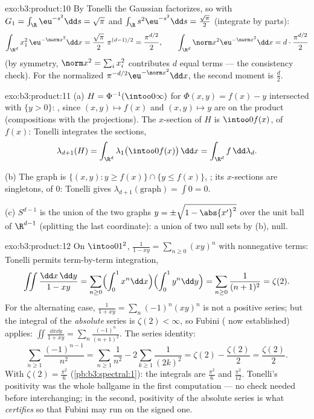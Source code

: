 \begin{solution}{exo:b3:product:10}
By Tonelli the Gaussian factorizes, so with $G_1 =
\int_\R\eu^{-s^2}\dd s = \sqrt\pi$ and $\int_\R
s^2\eu^{-s^2}\dd s = \frac{\sqrt\pi}2$ (integrate by parts):
\[
\int_{\R^d}x_1^2\,\eu^{-\norm x^2}\dd x =
\frac{\sqrt\pi}2\;\pi^{(d-1)/2} = \frac{\pi^{d/2}}2,
\qquad
\int_{\R^d}\norm x^2\eu^{-\norm x^2}\dd x =
d\cdot\frac{\pi^{d/2}}2
\]
(by symmetry, $\norm x^2 = \sum_ix_i^2$ contributes $d$ equal
terms --- the consistency check). For the normalized 
$\pi^{-d/2}\eu^{-\norm x^2}\dd x$, the second moment is
$\frac d2$.
\end{solution}

\begin{solution}{exo:b3:product:11}
(a) $H = \Phi^{-1}(\intoo0\infty)$ for $\Phi(x, y) = f(x) -
y$ intersected with $\{y > 0\}$: , since $(x, y)
\mapsto f(x)$ and $(x,y)\mapsto y$ are  on the
product (compositions with the projections). The
$x$-section of $H$ is $\intoo0{f(x)}$, of  $f(x)$:
Tonelli integrates the sections,
\[
\lambda_{d+1}(H) = \int_{\R^d}\lambda_1\bigl(\intoo0{f(x)}
\bigr)\,\dd x = \int_{\R^d}f\,\dd\lambda_d .
\]

(b) The graph is $\{(x,y) : y \geq f(x)\} \cap \{y \leq
f(x)\}$, ; its $x$-sections are singletons, of
 $0$: Tonelli gives $\lambda_{d+1}(\text{graph}) =
\int 0 = 0$.

(c) $S^{d-1}$ is the union of the two graphs $y =
\pm\sqrt{1 - \abs{x'}^2}$ over the unit ball of $\R^{d-1}$
(splitting the last coordinate): a union of two null sets by
(b), null.
\end{solution}

\begin{solution}{exo:b3:product:12}
On $\intoo01^2$, $\frac1{1 - xy} = \sum_{n\geq0}(xy)^n$ with
nonnegative terms: Tonelli permits term-by-term integration,
\[
\iint\frac{\dd x\,\dd y}{1 - xy}
= \sum_{n\geq0}\Bigl(\int_0^1x^n\dd x\Bigr)
\Bigl(\int_0^1y^n\dd y\Bigr)
= \sum_{n\geq0}\frac1{(n+1)^2} = \zeta(2) .
\]
For the alternating case, $\frac1{1 + xy} =
\sum_n(-1)^n(xy)^n$ is not a positive series; but the
integral of the \emph{absolute} series is $\zeta(2) <
\infty$, so Fubini ( now established) applies:
$\iint\frac{\dd x\dd y}{1 + xy} =
\sum_n\frac{(-1)^n}{(n+1)^2}$. The series identity:
\[
\sum_{n\geq1}\frac{(-1)^{n-1}}{n^2}
= \sum_{n\geq1}\frac1{n^2} - 2\sum_{k\geq1}\frac1{(2k)^2}
= \zeta(2) - \frac{\zeta(2)}2 = \frac{\zeta(2)}2 .
\]
With $\zeta(2) = \frac{\pi^2}6$ (\cref{pb:b3:spectral:1}):
the integrals are $\frac{\pi^2}6$ and $\frac{\pi^2}{12}$.
Tonelli's positivity was the whole ballgame in the first
computation --- no  check needed before
interchanging; in the second, positivity of the absolute
series is what \emph{certifies}  so that
Fubini may run on the signed one.
\end{solution}

